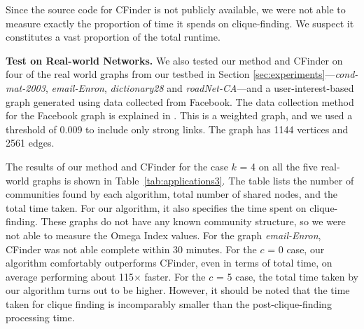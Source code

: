 Since the source code for CFinder is not publicly available, we were not able to measure exactly the proportion of time it spends on clique-finding. 
We suspect it constitutes a vast proportion of the total runtime.


{\bf Test on Real-world Networks. } We also tested our method and CFinder on four of the real world graphs from our testbed in Section \ref{sec:experiments}---{\em cond-mat-2003}, {\em email-Enron}, {\em dictionary28} and {\em roadNet-CA}---and a user-interest-based graph generated using data collected from Facebook. The data collection method for the Facebook graph is explained in \cite{dianapaper}. This is a weighted graph, and we used a threshold of 0.009 to include only strong links. The graph has 1144 vertices and 2561 edges. 

The results of our method and CFinder for the case $k$ = 4 on all the five 
real-world graphs is shown in  Table~\ref{tab:applications3}. The table lists the number of communities found by each algorithm, total number of shared nodes, and the total time taken. For our algorithm, it also specifies the time spent on clique-finding. These graphs do not have any known community structure, so we were not able to measure the Omega Index values. For the graph {\em email-Enron}, CFinder was not able complete within 30 minutes. For the $c$ = 0 case, our algorithm comfortably outperforms CFinder, even in terms of total time, on average performing about 115$\times$ faster. For the $c$ = 5 case, the total time taken by our algorithm turns out to be higher. However, it should be noted that the time taken for clique finding is incomparably smaller than the post-clique-finding processing time.  

